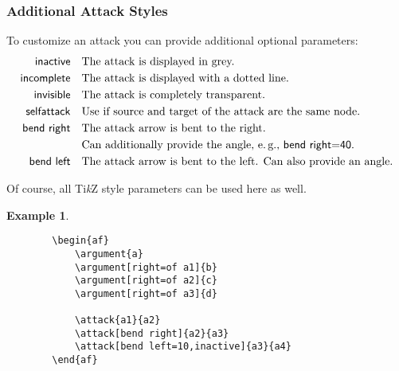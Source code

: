 \documentclass[headings=normal]{scrartcl}
\newcommand{\tikzname}{Ti\emph{k}Z\xspace}
\newtheorem{example}{Example}
\begin{document}
\subsubsection{Additional Attack Styles}
    To customize an attack you can provide additional optional parameters:
    \begin{align*}
        \mathsf{inactive} &\quad \text{The attack is displayed in grey.}\\
        \mathsf{incomplete} &\quad \text{The attack is displayed with a dotted line.}\\
        \mathsf{invisible} &\quad \text{The attack is completely transparent.}\\
        \mathsf{selfattack} &\quad \text{Use if source and target of the attack are the same node.}\\
        \mathsf{bend~right} &\quad \text{The attack arrow is bent to the right.}\\
        &\quad \text{Can additionally provide the angle, e.\,g., \textsf{bend~right=40}.}\\
        \mathsf{bend~left} &\quad \text{The attack arrow is bent to the left. Can also provide an angle.}
    \end{align*}
    
    Of course, all \tikzname style parameters can be used here as well.

    \newpage
    \begin{example}~

    \begin{minipage}{0.32\textwidth}
    \begin{center}
        \begin{af}
    
        \end{af}
    \end{center}
    \end{minipage}%
    \begin{minipage}{0.5\textwidth}
    \begin{verbatim}
        \begin{af}
            \argument{a}
            \argument[right=of a1]{b}
            \argument[right=of a2]{c}
            \argument[right=of a3]{d}
    
            \attack{a1}{a2}
            \attack[bend right]{a2}{a3}
            \attack[bend left=10,inactive]{a3}{a4}
        \end{af}
    \end{verbatim}
    \end{minipage}%
    
    \end{example}
\end{document}
